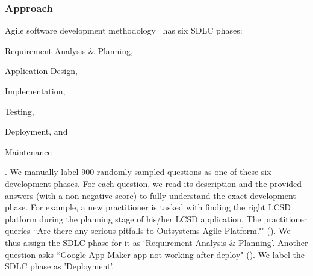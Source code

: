 \subsubsection{Approach}
Agile software development methodology~\cite{beck2001manifesto} has six SDLC phases:  \begin{inparaenum}[(1)]
\item Requirement Analysis \& Planning, 
\item Application Design,
\item Implementation, 
\item Testing,
\item Deployment, and
\item Maintenance 
\end{inparaenum}. We manually label 900 randomly sampled questions as one of these six development phases. For each question, we read its description and the provided answers (with a non-negative score) to fully understand the exact development phase. For example, a new practitioner is tasked with finding the right LCSD platform during the planning stage of his/her 
LCSD application. The practitioner queries ``Are there any serious pitfalls to Outsystems Agile Platform?" (). We thus assign the SDLC phase for it as `Requirement Analysis \& Planning'. Another question asks ``Google  App  Maker  app  not  working  after  deploy" (). We label the SDLC phase as 'Deployment'. 


